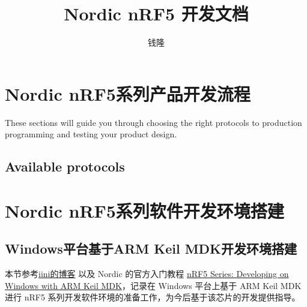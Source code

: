 \documentclass{WHUResearch}  %
\begin{document}

\title{Nordic nRF5 开发文档}
\author{钱隆}

\maketitle

\cleardoublepage
\newpage  \pagestyle{fancy} \fancyfancy

\tableofcontents

\mainmatter %
\baselineskip=20pt  %
\chapter{Nordic nRF5系列产品开发流程}

These sections will guide you through choosing the right protocols to production programming and testing your product design.

\section{Available protocols}




\chapter{Nordic nRF5系列软件开发环境搭建}

\section{Windows平台基于ARM Keil MDK开发环境搭建}

本节参考\href{https://www.cnblogs.com/iini/p/9043565.html}{iini的博客}  以及 Nordic 的官方入门教程 \href{https://infocenter.nordicsemi.com/index.jsp?topic=\%2Fug_gsg_keil\%2FUG\%2Fgsg\%2Fintro.html&cp=1_1_1}{nRF5 Series: Developing on Windows with ARM Keil MDK}，记录在 Windows 平台上基于 ARM Keil MDK 进行 nRF5 系列开发软件环境的准备工作，为今后基于该芯片的开发提供指导。
\end{document}

